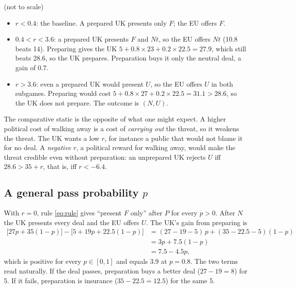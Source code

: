\documentclass[11pt,a4paper]{article}
\newcommand{\Nt}{\mathit{Nt}}
\newcommand{\dF}{\mathit{F}}
\newcommand{\dU}{\mathit{U}}
\begin{document}
\begin{center}

\footnotesize (not to scale)
\end{center}

\begin{itemize}
  \item \textbf{$r<0.4$}: the baseline. A prepared UK presents only $\dF$; the EU offers $\dF$.
  \item \textbf{$0.4<r<3.6$}: a prepared UK presents $\dF$ and $\Nt$, so the EU offers $\Nt$ (10.8
    beats 14). Preparing gives the UK $5+0.8\times23+0.2\times22.5=27.9$, which still beats 28.6, so the
    UK prepares. Preparation buys it only the neutral deal, a gain of $0.7$.
  \item \textbf{$r>3.6$}: even a prepared UK would present $\dU$, so the EU offers $\dU$ in both
    subgames. Preparing would cost $5+0.8\times27+0.2\times22.5=31.1>28.6$, so the UK does not
    prepare. The outcome is $(N,\dU)$.
\end{itemize}

The comparative static is the opposite of what one might expect. A higher political cost of walking
away is a cost of \emph{carrying out} the threat, so it weakens the threat. The UK wants a
low $r$, for instance a public that would not blame it for no deal. A \emph{negative} $r$, a political
reward for walking away, would make the threat credible even without preparation: an unprepared
UK rejects $\dU$ iff $28.6>35+r$, that is, iff $r<-6.4$.

\subsection{\texorpdfstring{A general pass probability $p$}{A general pass probability p}}

With $r=0$, rule \eqref{eq:rule} gives ``present $\dF$ only'' after $P$ for every $p>0$. After $N$ the
UK presents every deal and the EU offers $\dU$. The UK's gain from preparing is
\begin{align*}
  \bigl[27p+35(1-p)\bigr]-\bigl[5+19p+22.5(1-p)\bigr]
    &= (27-19-5)\,p+(35-22.5-5)(1-p)\\
    &= 3p+7.5(1-p)\\
    &= 7.5-4.5p,
\end{align*}
which is positive for every $p\in[0,1]$ and equals 3.9 at $p=0.8$. The two terms read
naturally. If the deal passes, preparation buys a better deal ($27-19=8$) for 5. If it fails,
preparation is insurance ($35-22.5=12.5$) for the same 5.
\end{document}
